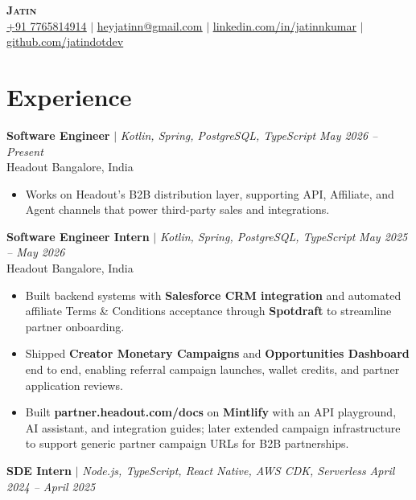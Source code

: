 \documentclass[a4paper,11pt]{article}
\newcommand{\resumeItem}[1]{
  \item\small{
    {#1 \vspace{-2pt}}
  }
}
\newcommand{\resumeItemListStart}{\begin{itemize}[leftmargin=0.2in, topsep=0pt, partopsep=0pt]}
\newcommand{\resumeItemListEnd}{\end{itemize}\vspace{-5pt}}
\begin{document}
\begin{center}
    \textbf{\Huge \scshape Jatin} \\\vspace{1pt}\small
    \href{tel:+917765814914}{\underline{+91 7765814914}} $|$
    \href{mailto:heyjatinn@gmail.com}{\underline{heyjatinn@gmail.com}} $|$
    \href{https://linkedin.com/in/jatinnkumar}{\underline{linkedin.com/in/jatinnkumar}} $|$
    \href{https://github.com/jatindotdev}{\underline{github.com/jatindotdev}}
\end{center}

\section{Experience}
\begin{itemize}[leftmargin=0.15in, label={}]
    \small{
        \item{
            {\textbf{Software Engineer} $|$ \emph{Kotlin, Spring, PostgreSQL, TypeScript} \hfill \emph{May 2026 -- Present}}\\
            {Headout \hfill Bangalore, India}
            \resumeItemListStart
                \resumeItem{Works on Headout's B2B distribution layer, supporting API, Affiliate, and Agent channels that power third-party sales and integrations.}
            \resumeItemListEnd
        }
    }
    \small{
        \item{
            {\textbf{Software Engineer Intern} $|$ \emph{Kotlin, Spring, PostgreSQL, TypeScript} \hfill \emph{May 2025 -- May 2026}}\\
            {Headout \hfill Bangalore, India}
            \resumeItemListStart
                \resumeItem{Built backend systems with \textbf{Salesforce CRM integration} and automated affiliate Terms \& Conditions acceptance through \textbf{Spotdraft} to streamline partner onboarding.}
                \resumeItem{Shipped \textbf{Creator Monetary Campaigns} and \textbf{Opportunities Dashboard} end to end, enabling referral campaign launches, wallet credits, and partner application reviews.}
                \resumeItem{Built \textbf{partner.headout.com/docs} on \textbf{Mintlify} with an API playground, AI assistant, and integration guides; later extended campaign infrastructure to support generic partner campaign URLs for B2B partnerships.}
            \resumeItemListEnd
        }
    }
    \small{
        \item{
            {\textbf{SDE Intern} $|$ \emph{Node.js, TypeScript, React Native, AWS CDK, Serverless} \hfill \emph{April 2024 -- April 2025}}\\
}}
\end{itemize}
\end{document}
